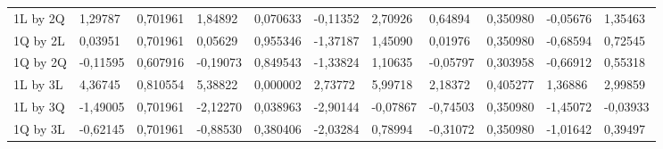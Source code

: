 \begin{table}[H]
{\begin{tabular}{lllllllllll}
\rowcolor[HTML]{FFFFFF} 
{\color[HTML]{000000} 1L by 2Q}       & {\color[HTML]{000000} 1,29787}  & {\color[HTML]{000000} 0,701961} & {\color[HTML]{000000} 1,84892}  & {\color[HTML]{000000} 0,070633} & {\color[HTML]{000000} -0,11352}       & {\color[HTML]{000000} 2,70926}        & {\color[HTML]{000000} 0,64894}  & {\color[HTML]{000000} 0,350980}      & {\color[HTML]{000000} -0,05676}       & {\color[HTML]{000000} 1,35463}        \\
\rowcolor[HTML]{FFFFFF} 
{\color[HTML]{000000} 1Q by 2L}       & {\color[HTML]{000000} 0,03951}  & {\color[HTML]{000000} 0,701961} & {\color[HTML]{000000} 0,05629}  & {\color[HTML]{000000} 0,955346} & {\color[HTML]{000000} -1,37187}       & {\color[HTML]{000000} 1,45090}        & {\color[HTML]{000000} 0,01976}  & {\color[HTML]{000000} 0,350980}      & {\color[HTML]{000000} -0,68594}       & {\color[HTML]{000000} 0,72545}        \\
\rowcolor[HTML]{FFFFFF} 
{\color[HTML]{000000} 1Q by 2Q}       & {\color[HTML]{000000} -0,11595} & {\color[HTML]{000000} 0,607916} & {\color[HTML]{000000} -0,19073} & {\color[HTML]{000000} 0,849543} & {\color[HTML]{000000} -1,33824}       & {\color[HTML]{000000} 1,10635}        & {\color[HTML]{000000} -0,05797} & {\color[HTML]{000000} 0,303958}      & {\color[HTML]{000000} -0,66912}       & {\color[HTML]{000000} 0,55318}        \\
\rowcolor[HTML]{FFFFFF} 
{\color[HTML]{000000} 1L by 3L}       & {\color[HTML]{FF0000} 4,36745}  & {\color[HTML]{FF0000} 0,810554} & {\color[HTML]{FF0000} 5,38822}  & {\color[HTML]{FF0000} 0,000002} & {\color[HTML]{FF0000} 2,73772}        & {\color[HTML]{FF0000} 5,99718}        & {\color[HTML]{FF0000} 2,18372}  & {\color[HTML]{FF0000} 0,405277}      & {\color[HTML]{FF0000} 1,36886}        & {\color[HTML]{FF0000} 2,99859}        \\
\rowcolor[HTML]{FFFFFF} 
{\color[HTML]{000000} 1L by 3Q}       & {\color[HTML]{FF0000} -1,49005} & {\color[HTML]{FF0000} 0,701961} & {\color[HTML]{FF0000} -2,12270} & {\color[HTML]{FF0000} 0,038963} & {\color[HTML]{FF0000} -2,90144}       & {\color[HTML]{FF0000} -0,07867}       & {\color[HTML]{FF0000} -0,74503} & {\color[HTML]{FF0000} 0,350980}      & {\color[HTML]{FF0000} -1,45072}       & {\color[HTML]{FF0000} -0,03933}       \\
\rowcolor[HTML]{FFFFFF} 
{\color[HTML]{000000} 1Q by 3L}       & {\color[HTML]{000000} -0,62145} & {\color[HTML]{000000} 0,701961} & {\color[HTML]{000000} -0,88530} & {\color[HTML]{000000} 0,380406} & {\color[HTML]{000000} -2,03284}       & {\color[HTML]{000000} 0,78994}        & {\color[HTML]{000000} -0,31072} & {\color[HTML]{000000} 0,350980}      & {\color[HTML]{000000} -1,01642}       & {\color[HTML]{000000} 0,39497}        \\

\end{tabular}}
\end{table}
